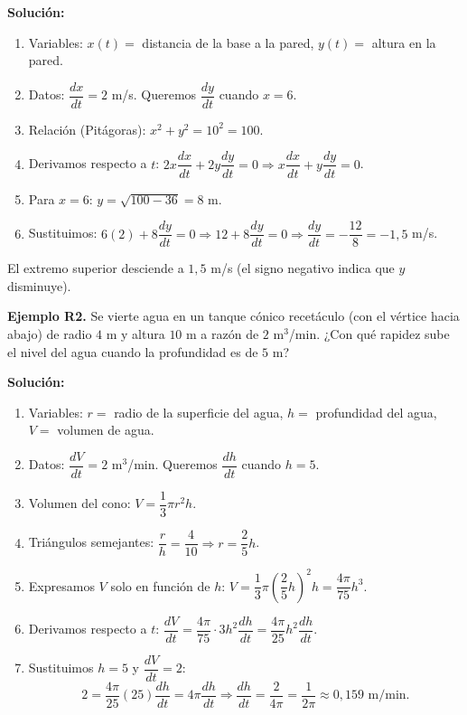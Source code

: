 \documentclass[12pt, a4paper]{article}
\begin{document}
\begin{cuadrosolucion}
  \textbf{Solución:}
  \begin{enumerate}
    \item Variables: $x(t) =$ distancia de la base a la pared, $y(t) =$ altura en la pared.
    \item Datos: $\dfrac{dx}{dt} = 2$ m/s. Queremos $\dfrac{dy}{dt}$ cuando $x = 6$.
    \item Relación (Pitágoras): $x^2 + y^2 = 10^2 = 100$.
    \item Derivamos respecto a $t$: $2x \dfrac{dx}{dt} + 2y \dfrac{dy}{dt} = 0 \Rightarrow x \dfrac{dx}{dt} + y \dfrac{dy}{dt} = 0$.
    \item Para $x = 6$: $y = \sqrt{100 - 36} = 8$ m.
    \item Sustituimos: $6(2) + 8 \dfrac{dy}{dt} = 0 \Rightarrow 12 + 8 \dfrac{dy}{dt} = 0 \Rightarrow \dfrac{dy}{dt} = -\dfrac{12}{8} = -1{,}5$ m/s.
  \end{enumerate}
  El extremo superior desciende a $1{,}5$ m/s (el signo negativo indica que $y$ disminuye).
\end{cuadrosolucion}

\textbf{Ejemplo R2.} Se vierte agua en un tanque cónico recetáculo (con el vértice hacia abajo) de radio $4$ m y altura $10$ m a razón de $2$ m$^3$/min. ¿Con qué rapidez sube el nivel del agua cuando la profundidad es de $5$ m?

\begin{cuadrosolucion}
  \textbf{Solución:}
  \begin{enumerate}
    \item Variables: $r =$ radio de la superficie del agua, $h =$ profundidad del agua, $V =$ volumen de agua.
    \item Datos: $\dfrac{dV}{dt} = 2$ m$^3$/min. Queremos $\dfrac{dh}{dt}$ cuando $h = 5$.
    \item Volumen del cono: $V = \dfrac{1}{3}\pi r^2 h$.
    \item Triángulos semejantes: $\dfrac{r}{h} = \dfrac{4}{10} \Rightarrow r = \dfrac{2}{5}h$.
    \item Expresamos $V$ solo en función de $h$: $V = \dfrac{1}{3}\pi \left(\dfrac{2}{5}h\right)^2 h = \dfrac{4\pi}{75} h^3$.
    \item Derivamos respecto a $t$: $\dfrac{dV}{dt} = \dfrac{4\pi}{75} \cdot 3h^2 \dfrac{dh}{dt} = \dfrac{4\pi}{25} h^2 \dfrac{dh}{dt}$.
    \item Sustituimos $h = 5$ y $\dfrac{dV}{dt} = 2$:
          $$2 = \dfrac{4\pi}{25}(25) \dfrac{dh}{dt} = 4\pi \dfrac{dh}{dt} \Rightarrow \dfrac{dh}{dt} = \dfrac{2}{4\pi} = \dfrac{1}{2\pi} \approx 0{,}159 \text{ m/min}.$$
  \end{enumerate}
\end{cuadrosolucion}
\end{document}
